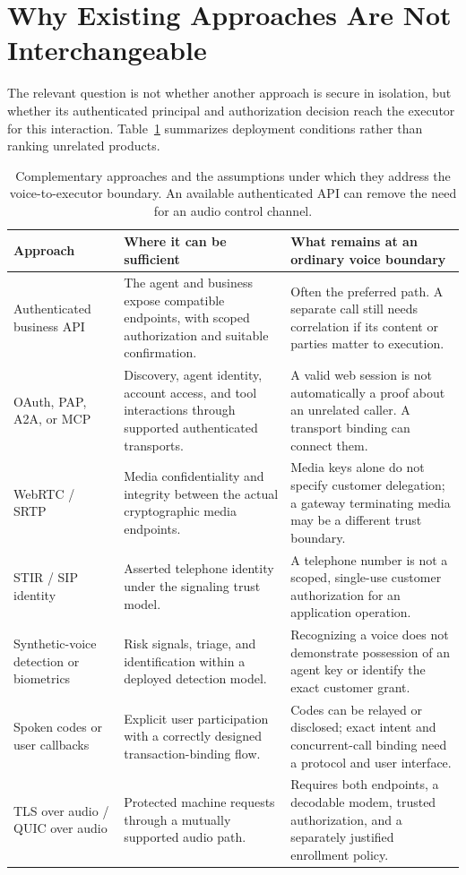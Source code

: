 \section{Why Existing Approaches Are Not Interchangeable}
\label{sec:alternatives}
The relevant question is not whether another approach is secure in isolation,
but whether its authenticated principal and authorization decision reach the
executor for this interaction. Table~\ref{tab:alternatives} summarizes deployment
conditions rather than ranking unrelated products.

\begin{table}[t]
\centering
\begin{tabularx}{\textwidth}{p{1.30in}XX}
\toprule
Approach & Where it can be sufficient & What remains at an ordinary voice boundary \\
\midrule
Authenticated business API & The agent and business expose compatible endpoints, with scoped authorization and suitable confirmation. & Often the preferred path. A separate call still needs correlation if its content or parties matter to execution. \\
OAuth, PAP, A2A, or MCP & Discovery, agent identity, account access, and tool interactions through supported authenticated transports. & A valid web session is not automatically a proof about an unrelated caller. A transport binding can connect them. \\
WebRTC / SRTP & Media confidentiality and integrity between the actual cryptographic media endpoints. & Media keys alone do not specify customer delegation; a gateway terminating media may be a different trust boundary. \\
STIR / SIP identity & Asserted telephone identity under the signaling trust model. & A telephone number is not a scoped, single-use customer authorization for an application operation. \\
Synthetic-voice detection or biometrics & Risk signals, triage, and identification within a deployed detection model. & Recognizing a voice does not demonstrate possession of an agent key or identify the exact customer grant. \\
Spoken codes or user callbacks & Explicit user participation with a correctly designed transaction-binding flow. & Codes can be relayed or disclosed; exact intent and concurrent-call binding need a protocol and user interface. \\
TLS over audio / QUIC over audio & Protected machine requests through a mutually supported audio path. & Requires both endpoints, a decodable modem, trusted authorization, and a separately justified enrollment policy. \\
\bottomrule
\end{tabularx}
\caption{Complementary approaches and the assumptions under which they address the voice-to-executor boundary. An available authenticated API can remove the need for an audio control channel.}
\label{tab:alternatives}
\end{table}

